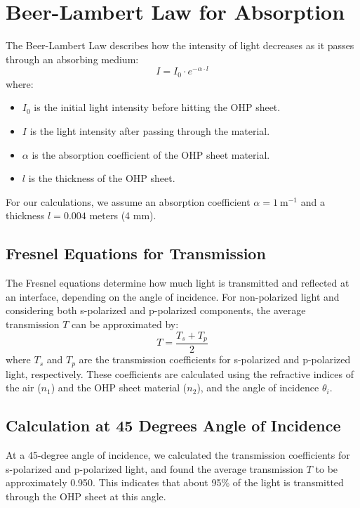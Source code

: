 \section{Beer-Lambert Law for Absorption}
The Beer-Lambert Law describes how the intensity of light decreases as it passes through an absorbing medium:
\[ I = I_0 \cdot e^{-\alpha \cdot l} \]
where:
\begin{itemize}
    \item \(I_0\) is the initial light intensity before hitting the OHP sheet.
    \item \(I\) is the light intensity after passing through the material.
    \item \(\alpha\) is the absorption coefficient of the OHP sheet material.
    \item \(l\) is the thickness of the OHP sheet.
\end{itemize}

For our calculations, we assume an absorption coefficient \(\alpha = 1\ \text{m}^{-1}\) and a thickness \(l = 0.004\) meters (4 mm).

\subsection*{Fresnel Equations for Transmission}
The Fresnel equations determine how much light is transmitted and reflected at an interface, depending on the angle of incidence. For non-polarized light and considering both s-polarized and p-polarized components, the average transmission \(T\) can be approximated by:
\[ T = \frac{T_s + T_p}{2} \]
where \(T_s\) and \(T_p\) are the transmission coefficients for s-polarized and p-polarized light, respectively. These coefficients are calculated using the refractive indices of the air (\(n_1\)) and the OHP sheet material (\(n_2\)), and the angle of incidence \(\theta_i\).

\subsection*{Calculation at 45 Degrees Angle of Incidence}
At a 45-degree angle of incidence, we calculated the transmission coefficients for s-polarized and p-polarized light, and found the average transmission \(T\) to be approximately 0.950. This indicates that about 95\% of the light is transmitted through the OHP sheet at this angle.

